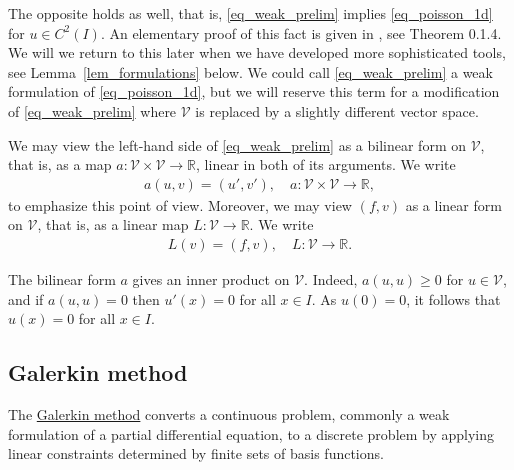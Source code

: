 \documentclass[12pt,oneside]{amsart}
\def\R{\mathbb R}
\begin{document}
The opposite holds as well, that is, \eqref{eq_weak_prelim} implies \eqref{eq_poisson_1d} for $u \in C^2(I)$.
An elementary proof of this fact is given in \cite{BS}, see Theorem 0.1.4. We will we return to this later when we have developed more sophisticated tools, see Lemma~\ref{lem_formulations} below.
We could call \eqref{eq_weak_prelim} a weak formulation of \eqref{eq_poisson_1d}, but we will reserve this term for a modification of \eqref{eq_weak_prelim} where $\mathcal V$ is replaced by a slightly different vector space.  

We may view the left-hand side of \eqref{eq_weak_prelim} as a bilinear form on $\mathcal V$, that is, as a map $a: \mathcal V \times \mathcal V \to \R$, linear in both of its arguments.
We write  
    \begin{align}\label{def_a}
a(u, v) = (u', v'), \quad a : \mathcal V \times \mathcal V \to \mathbb R,
    \end{align}
to emphasize this point of view.   
Moreover, we may view $(f, v)$ as a linear form on $\mathcal V$, that is, as a linear map $L : \mathcal V \to \R$. We write 
    \begin{align}\label{def_L}
L(v) = (f,v), \quad L : \mathcal V \to \R.
    \end{align}

The bilinear form $a$ gives an inner product on $\mathcal V$. Indeed, $a(u,u) \ge 0$ for $u \in \mathcal V$, and if $a(u,u) = 0$ then $u'(x) = 0$ for all $x \in I$.
As $u(0) = 0$, it follows that $u(x) = 0$ for all $x \in I$.

\subsection{Galerkin method}

The \href{https://en.wikipedia.org/wiki/Galerkin_method}{Galerkin method} converts a continuous problem, commonly a weak formulation of a partial differential equation, to a discrete problem by applying linear constraints determined by finite sets of basis functions.
\end{document}
